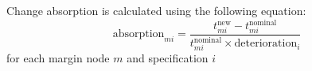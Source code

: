 \begin{frame}[t,label=ap2_2]
\begin{columns}[t]
		\begin{column}{.4\textwidth} %
			Change absorption is calculated using the following equation:
			\renewcommand\baselinestretch{0.5}
			\begin{equation*}
				\text{absorption}_{mi} = \dfrac{t^\text{new}_{mi} - t^\text{nominal}_{mi}}{t^\text{nominal}_{mi}\times\text{deterioration}_i}
			\end{equation*}
			for each margin node $m$ and specification $i$
			\renewcommand{\kbldelim}{[}%
			\renewcommand{\kbrdelim}{]}%
			\only<1>{
				\[
				  \text{absorption} = \kbordermatrix{
										& T_1	& T_2	\\
					\text{buckling} 	&2.79	& 3.87	\\
					\text{compression} 	&1.98	& 3.04	\\
					\text{bending} 		&2.58	& 3.66	\\
				  }
				\]
			}%
		\end{column}
		
	\end{columns}
	
\end{frame}
